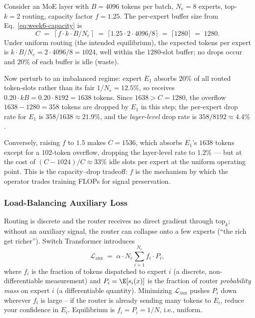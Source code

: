 \begin{workedexample}
Consider an MoE layer with $B = 4096$ tokens per batch, $N_e = 8$
experts, top-$k = 2$ routing, capacity factor $f = 1.25$. The
per-expert buffer size from Eq.~\eqref{eq:week6-capacity} is
\[
C \;=\; \left\lceil f \cdot k \cdot B / N_e \right\rceil
  \;=\; \lceil 1.25 \cdot 2 \cdot 4096 / 8 \rceil
  \;=\; \lceil 1280 \rceil \;=\; 1280.
\]
Under uniform routing (the intended equilibrium), the expected tokens
per expert is $k \cdot B / N_e = 2 \cdot 4096 / 8 = 1024$, well
within the $1280$-slot buffer; no drops occur and $20\%$ of each
buffer is idle (waste).

Now perturb to an imbalanced regime: expert $E_1$ absorbs $20\%$ of
all routed token-slots rather than its fair $1/N_e = 12.5\%$, so
receives $0.20 \cdot k B = 0.20 \cdot 8192 = 1638$ tokens. Since
$1638 > C = 1280$, the overflow $1638 - 1280 = 358$ tokens are
dropped by $E_1$ in this step; the per-expert drop rate for $E_1$ is
$358/1638 \approx 21.9\%$, and the \emph{layer-level} drop rate is
$358 / 8192 \approx 4.4\%$.

Conversely, raising $f$ to $1.5$ makes $C = 1536$, which absorbs
$E_1$'s $1638$ tokens except for a $102$-token overflow, dropping the
layer-level rate to $1.2\%$ --- but at the cost of $(C - 1024)/C
\approx 33\%$ idle slots per expert at the uniform operating point.
This is the capacity--drop tradeoff: $f$ is the mechanism by which
the operator trades training FLOPs for signal preservation.
\end{workedexample}

\subsubsection{Load-Balancing Auxiliary Loss}

Routing is discrete and the router receives no direct gradient
through $\mathrm{top}_k$; without an auxiliary signal, the router can
collapse onto a few experts (``the rich get richer''). Switch
Transformer introduces
\begin{equation}
\label{eq:week6-load-balance}
\mathcal{L}_{\mathrm{aux}}
   \;=\; \alpha \cdot N_e \sum_{i=1}^{N_e} f_i \cdot P_i,
\end{equation}
where $f_i$ is the fraction of tokens dispatched to expert $i$ (a
discrete, non-differentiable measurement) and $P_i = \E[s_i(x)]$ is
the fraction of router \emph{probability mass} on expert $i$ (a
differentiable quantity). Minimizing $\mathcal{L}_{\mathrm{aux}}$
pushes $P_i$ down wherever $f_i$ is large -- if the router is already
sending many tokens to $E_i$, reduce your confidence in $E_i$.
Equilibrium is $f_i = P_i = 1/N$, i.e., uniform.


